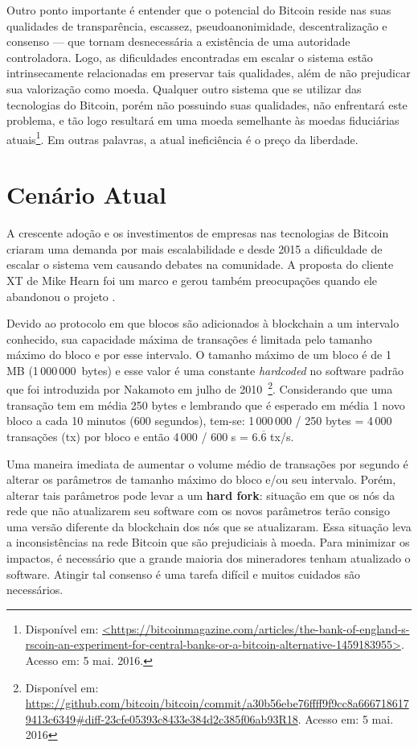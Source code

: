 Outro ponto importante é entender que o potencial do Bitcoin reside nas suas qualidades de transparência, escassez, pseudoanonimidade, descentralização e consenso --- que tornam desnecessária a existência de uma autoridade controladora. Logo, as dificuldades encontradas em escalar o sistema estão intrinsecamente relacionadas em preservar tais qualidades, além de não prejudicar sua valorização como moeda. Qualquer outro sistema que se utilizar das tecnologias do Bitcoin, porém não possuindo suas qualidades, não enfrentará este problema, e tão logo resultará em uma moeda semelhante às moedas fiduciárias atuais\footnote{Disponível em: \href{https://bitcoinmagazine.com/articles/the-bank-of-england-s-rscoin-an-experiment-for-central-banks-or-a-bitcoin-alternative-1459183955}{<https://bitcoinmagazine.com/articles/the-bank-of-england-s-rscoin-an-experiment-for-central-banks-or-a-bitcoin-alternative-1459183955>}. Acesso em: 5 mai. 2016.}. Em outras palavras, a atual ineficiência é o preço da liberdade.

\section{Cenário Atual}

A crescente adoção e os investimentos de empresas nas tecnologias de Bitcoin criaram uma demanda por mais escalabilidade e desde 2015 a dificuldade de escalar o sistema vem causando debates na comunidade. A proposta do cliente XT de Mike Hearn foi um marco e gerou também preocupações quando ele abandonou o projeto \cite{bib:escalabilidade-noticia}.

Devido ao protocolo em que blocos são adicionados à blockchain a um intervalo conhecido, sua capacidade máxima de transações é limitada pelo tamanho máximo do bloco e por esse intervalo. O tamanho máximo de um bloco é de 1 MB (1\,000\,000~bytes) e esse valor é uma constante \textit{hardcoded} no software padrão que foi introduzida por Nakamoto em julho de 2010~\footnote{Disponível em: \url{https://github.com/bitcoin/bitcoin/commit/a30b56ebe76ffff9f9cc8a6667186179413c6349\#diff-23cfe05393c8433e384d2c385f06ab93R18}. Acesso em: 5 mai. 2016}. Considerando que uma transação tem em média 250 bytes e lembrando que é esperado em média 1 novo bloco a cada 10 minutos (600 segundos), tem-se: 1\,000\,000 / 250 bytes = 4\,000 transações (tx) por bloco e então 4\,000 / 600 s = $6.\overline{6}$ tx/s.

Uma maneira imediata de aumentar o volume médio de transações por segundo é alterar os parâmetros de tamanho máximo do bloco e/ou seu intervalo. Porém, alterar tais parâmetros pode levar a um \textbf{hard fork}: situação em que os nós da rede que não atualizarem seu software com os novos parâmetros terão consigo uma versão diferente da blockchain dos nós que se atualizaram. Essa situação leva a inconsistências na rede Bitcoin que são prejudiciais à moeda. Para minimizar os impactos, é necessário que a grande maioria dos mineradores tenham atualizado o software. Atingir tal consenso é uma tarefa difícil e muitos cuidados são necessários.


